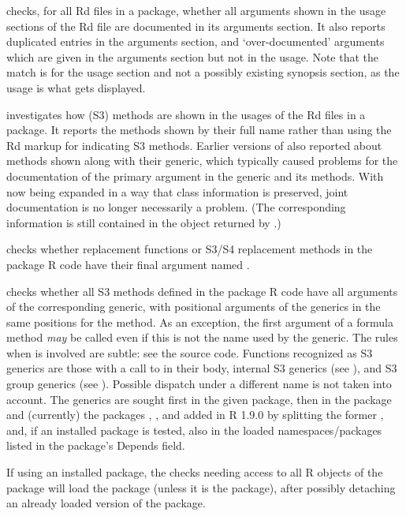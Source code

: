 \begin{Details}\relax
{} checks, for all Rd files in a package, whether all
arguments shown in the usage sections of the Rd file are documented in
its arguments section.  It also reports duplicated entries in the
arguments section, and `over-documented' arguments which are
given in the arguments section but not in the usage.  Note that the
match is for the usage section and not a possibly existing synopsis
section, as the usage is what gets displayed.

 investigates how (S3) methods are shown in the
usages of the Rd files in a package.  It reports the methods shown by
their full name rather than using the Rd  markup for
indicating S3 methods.  Earlier versions of \R{} also reported about
methods shown along with their generic, which typically caused
problems for the documentation of the primary argument in the generic
and its methods.  With  now being expanded in a way
that class information is preserved, joint documentation is
no longer necessarily a problem.  (The corresponding information is
still contained in the object returned by .)

 checks whether replacement functions or S3/S4
replacement methods in the package R code have their final argument
named .

 checks whether all S3 methods defined in the
package R code have all arguments of the corresponding generic, with
positional arguments of the generics in the same positions for the
method.  As an exception, the first argument of a formula method
\emph{may} be called  even if this is not the name used
by the generic.  The rules when  is involved are subtle:
see the source code.  Functions recognized as S3 generics are those
with a call to  in their body, internal S3 generics
(see ), and S3 group generics (see
).  Possible dispatch under a
different name is not taken into account.  The generics are sought
first in the given package, then in the  package and
(currently) the packages , , and 
added in R 1.9.0 by splitting the former , and, if an
installed package is tested, also in the loaded namespaces/packages
listed in the package's  Depends field.

If using an installed package, the checks needing access to all R
objects of the package will load the package (unless it is the
 package), after possibly detaching an already loaded
version of the package.
\end{Details}
